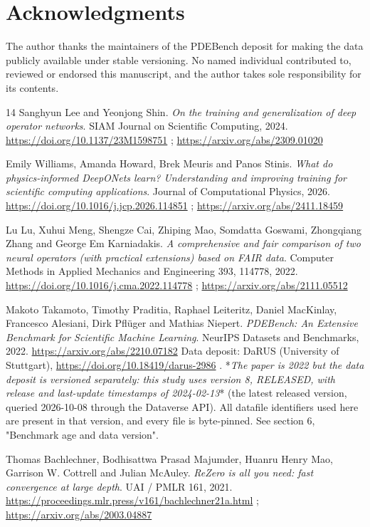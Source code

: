 \documentclass[preprint,12pt]{elsarticle}
\begin{document}
\section*{Acknowledgments}

The author thanks the maintainers of the PDEBench deposit for making the data publicly available under stable versioning. No named individual contributed to, reviewed or endorsed this manuscript, and the author takes sole responsibility for its contents.

\begin{thebibliography}{14}
Sanghyun Lee and Yeonjong Shin. \emph{On the training and generalization of deep operator networks}. SIAM Journal on Scientific Computing, 2024. \url{https://doi.org/10.1137/23M1598751} ; \url{https://arxiv.org/abs/2309.01020}

Emily Williams, Amanda Howard, Brek Meuris and Panos Stinis. \emph{What do physics-informed DeepONets learn? Understanding and improving training for scientific computing applications}. Journal of Computational Physics, 2026. \url{https://doi.org/10.1016/j.jcp.2026.114851} ; \url{https://arxiv.org/abs/2411.18459}

Lu Lu, Xuhui Meng, Shengze Cai, Zhiping Mao, Somdatta Goswami, Zhongqiang Zhang and George Em Karniadakis. \emph{A comprehensive and fair comparison of two neural operators (with practical extensions) based on FAIR data}. Computer Methods in Applied Mechanics and Engineering 393, 114778, 2022. \url{https://doi.org/10.1016/j.cma.2022.114778} ; \url{https://arxiv.org/abs/2111.05512}

Makoto Takamoto, Timothy Praditia, Raphael Leiteritz, Daniel MacKinlay, Francesco Alesiani, Dirk Pfl\"uger and Mathias Niepert. \emph{PDEBench: An Extensive Benchmark for Scientific Machine Learning}. NeurIPS Datasets and Benchmarks, 2022. \url{https://arxiv.org/abs/2210.07182} Data deposit: DaRUS (University of Stuttgart), \url{https://doi.org/10.18419/darus-2986} . *\emph{The paper is 2022 but the data deposit is versioned separately: this study uses version 8, RELEASED, with release and last-update timestamps of 2024-02-13}* (the latest released version, queried 2026-10-08 through the Dataverse API). All datafile identifiers used here are present in that version, and every file is byte-pinned. See section 6, "Benchmark age and data version".

Thomas Bachlechner, Bodhisattwa Prasad Majumder, Huanru Henry Mao, Garrison W. Cottrell and Julian McAuley. \emph{ReZero is all you need: fast convergence at large depth}. UAI / PMLR 161, 2021. \url{https://proceedings.mlr.press/v161/bachlechner21a.html} ; \url{https://arxiv.org/abs/2003.04887}


\end{thebibliography}
\end{document}

